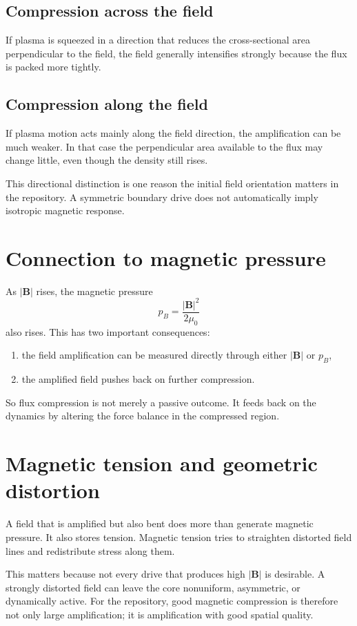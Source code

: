 \documentclass[11pt]{article}
\begin{document}
\subsection{Compression across the field}
If plasma is squeezed in a direction that reduces the cross-sectional area perpendicular to the field, the field generally intensifies strongly because the flux is packed more tightly.

\subsection{Compression along the field}
If plasma motion acts mainly along the field direction, the amplification can be much weaker. In that case the perpendicular area available to the flux may change little, even though the density still rises.

This directional distinction is one reason the initial field orientation matters in the repository. A symmetric boundary drive does not automatically imply isotropic magnetic response.

\section{Connection to magnetic pressure}
As $|\mathbf{B}|$ rises, the magnetic pressure
\[
p_B = \frac{|\mathbf{B}|^2}{2\mu_0}
\]
also rises. This has two important consequences:
\begin{enumerate}
    \item the field amplification can be measured directly through either $|\mathbf{B}|$ or $p_B$,
    \item the amplified field pushes back on further compression.
\end{enumerate}

So flux compression is not merely a passive outcome. It feeds back on the dynamics by altering the force balance in the compressed region.

\section{Magnetic tension and geometric distortion}
A field that is amplified but also bent does more than generate magnetic pressure. It also stores tension. Magnetic tension tries to straighten distorted field lines and redistribute stress along them.

This matters because not every drive that produces high $|\mathbf{B}|$ is desirable. A strongly distorted field can leave the core nonuniform, asymmetric, or dynamically active. For the repository, good magnetic compression is therefore not only large amplification; it is amplification with good spatial quality.
\end{document}
